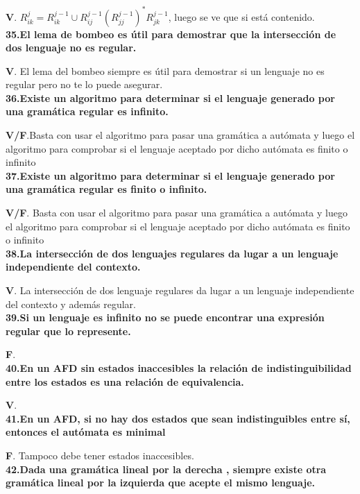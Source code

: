 \documentclass[a4paper,11pt]{article}
\begin{document}
\textbf{V}. $R_{ik}^j=R_{ik}^{j-1}\cup R_{ij}^{j-1}(R_{jj}^{j-1})^*R_{jk}^{j-1}$, luego se ve que si está contenido. \\

\textbf{35.El lema de bombeo es útil para demostrar que la intersección de dos lenguaje no es regular.}

\textbf{V}. El lema del bombeo siempre es útil para demostrar si un lenguaje no es regular pero no te lo puede asegurar. \\

\textbf{36.Existe un algoritmo para determinar si el lenguaje generado por una gramática regular es infinito.}

\textbf{V/F}.Basta con usar el algoritmo para pasar una gramática a autómata y luego el algoritmo para comprobar si el lenguaje aceptado por dicho autómata es finito o infinito \\

\textbf{37.Existe un algoritmo para determinar si el lenguaje generado por una gramática regular es finito o infinito.}

\textbf{V/F}. Basta con usar el algoritmo para pasar una gramática a autómata y luego el algoritmo para comprobar si el lenguaje aceptado por dicho autómata es finito o infinito \\

\textbf{38.La intersección de dos lenguajes regulares da lugar a un lenguaje independiente del contexto.}

\textbf{V}. La intersección de dos lenguaje regulares da lugar a un lenguaje independiente del contexto y además regular. \\

\textbf{39.Si un lenguaje es infinito no se puede encontrar una expresión regular que lo represente.}

\textbf{F}. \\

\textbf{40.En un AFD sin estados inaccesibles la relación de indistinguibilidad entre los estados es una relación de equivalencia.}

\textbf{V}. \\

\textbf{41.En un AFD, si no hay dos estados que sean indistinguibles entre sí, entonces el autómata es minimal}

\textbf{F}. Tampoco debe tener estados inaccesibles. \\

\textbf{42.Dada una gramática lineal por la derecha , siempre existe otra gramática lineal por la izquierda que acepte el mismo lenguaje.}
\end{document}
